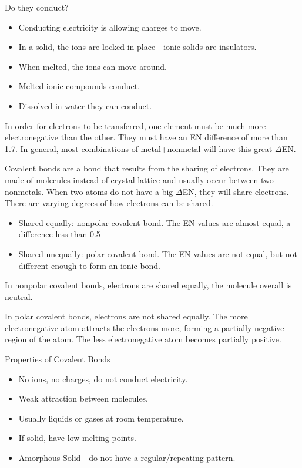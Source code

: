 \documentclass[../hchem.tex]{subfiles}
\begin{document}
Do they conduct?
\begin{itemize}
    \item Conducting electricity is allowing charges to move.
    \item In a solid, the ions are locked in place - ionic solids are insulators.
    \item When melted, the ions can move around.
    \item Melted ionic compounds conduct.
    \item Dissolved in water they can conduct.
\end{itemize}

In order for electrons to be transferred, one element must be much more electronegative than the other. They must have an 
EN difference of more than 1.7. In general, most combinations of metal+nonmetal will have this great $\Delta$EN.

Covalent bonds are a bond that results from the sharing of electrons. They are made of molecules instead of crystal lattice and usually occur between two nonmetals.
When two atoms do not have a big $\Delta$EN, they will share electrons. There are varying degrees of how electrons can be shared.
\begin{itemize}
    \item Shared equally: nonpolar covalent bond. The EN values are almost equal, a difference less than 0.5
    \item Shared unequally: polar covalent bond. The EN values are not equal, but not different enough to form an ionic bond.
\end{itemize}

In nonpolar covalent bonds, electrons are shared equally, the molecule overall is neutral.

In polar covalent bonds, electrons are not shared equally. The more electronegative atom attracts the electrons more, forming a partially negative region of the atom. The less electronegative atom becomes partially positive.

Properties of Covalent Bonds
\begin{itemize}
    \item No ions, no charges, do not conduct electricity.
    \item Weak attraction between molecules.
    \item Usually liquids or gases at room temperature.
    \item If solid, have low melting points.
    \item Amorphous Solid - do not have a regular/repeating pattern.
\end{itemize}
\end{document}
